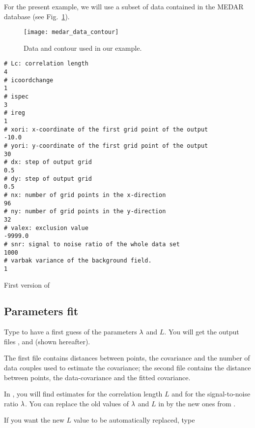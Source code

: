 For the present example, we will use a subset of data contained in the MEDAR database (see Fig.~\ref{dataplotCL}). 

\begin{figure}[htpb]
\centering
\parbox{.65\textwidth}{
\texttt{[image: medar\_data\_contour]}
}\parbox{.35\textwidth}{
\caption{Data and contour used in our example.\label{dataplotCL}}
}
\end{figure}


\begin{exfile}[htpb]
\begin{footnotesize}
\begin{verbatim}
# Lc: correlation length 
4
# icoordchange 
1
# ispec 
3
# ireg 
1
# xori: x-coordinate of the first grid point of the output
-10.0
# yori: y-coordinate of the first grid point of the output
30
# dx: step of output grid
0.5
# dy: step of output grid
0.5
# nx: number of grid points in the x-direction
96
# ny: number of grid points in the y-direction
32
# valex: exclusion value
-9999.0
# snr: signal to noise ratio of the whole data set
1000
# varbak variance of the background field. 
1
\end{verbatim}
\end{footnotesize}
\caption{First version of \label{paramfileCL}}
\end{exfile}


\subsection{Parameters fit}

Type  to have a first guess of the parameters $\lambda$ and $L$. You will get the output files ,  and    (shown hereafter). 

The first file contains distances between points, the covariance and the number of data couples used to estimate the covariance; the second file contains the distance between points, the data-covariance and the fitted covariance. 

In , you will find estimates for the correlation length $L$ and for the signal-to-noise ratio $\lambda$. You can replace the old values of $\lambda$ and $L$ in  by the new ones from .

If you want the new $L$ value to be automatically replaced, type 

